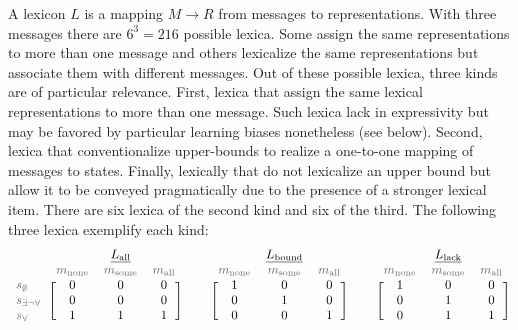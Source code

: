 \documentclass[a4paper, 11pt]{article}
\theoremstyle{Satz}
\newcommand{\state}{\ensuremath{s}\xspace}		%
\newcommand{\mystate}[1]{\ensuremath{\state_{\text{#1}}}\xspace} %
\newcommand{\mylang}[1]{\ensuremath{L_{\text{#1}}}\xspace} %
\newcommand{\Messgs}{\ensuremath{M}\xspace}		%
\newcommand{\messg}{\ensuremath{m}\xspace}		%
\newcommand{\mymessg}[1]{\ensuremath{\messg_{\text{#1}}}\xspace} %
\newcommand{\ssome}{\mystate{\ensuremath{\exists\neg\forall}}}
\newcommand{\sall}{\mystate{\ensuremath{\forall}}}
\newcommand{\snone}{\mystate{\ensuremath{\emptyset}}}
\newcommand{\msome}{\mymessg{some}}
\newcommand{\mall}{\mymessg{all}}
\newcommand{\mnone}{\mymessg{none}}
\newcommand{\Lall}{\mylang{all}}
\newcommand{\Lbound}{\mylang{bound}}
\newcommand{\Llack}{\mylang{lack}}
\newcommand{\mygray}[1]{{\textcolor{mygray}{#1}}}
\begin{document}
A lexicon $L$ is a mapping $\Messgs \rightarrow R$ from messages to representations. With three
messages there are $6^3 = 216$ possible lexica. Some assign the same representations to more than one
message and others lexicalize the same representations but associate them with different messages. Out
of these possible lexica, three kinds are of particular relevance. First, lexica that assign
the same lexical representations to more than one message. Such lexica lack in expressivity but may be favored
by particular learning biases nonetheless (see below). Second, lexica that conventionalize
upper-bounds to realize a one-to-one mapping of messages to states. Finally, lexically that do
not lexicalize an upper bound but allow it to be conveyed pragmatically due to the presence of
a stronger lexical item. There are six lexica of the second kind and six of the third. 
The following three lexica exemplify each kind:
\begin{align*}
  \begin{blockarray}{lccc}
    & & \underline{\Lall} & \\
    & \mygray{\mnone} & \mygray{\msome} & \mygray{\mall} \\
    \begin{block}{l[ccc]}
     \mygray{\snone}  & 0 & 0 & 0\\
     \mygray{\ssome}  & 0 & 0 & 0\\
    \mygray{\sall}   & 1 & 1 & 1\\
    \end{block}
  \end{blockarray} & &
 \begin{blockarray}{lccc}
    & & \underline{\Lbound} & \\
    & \mygray{\mnone} & \mygray{\msome} & \mygray{\mall} \\
    \begin{block}{l[ccc]}
       & 1 & 0 & 0\\
       & 0 & 1 & 0\\
       & 0 & 0 & 1\\
    \end{block}
  \end{blockarray} & &
  \begin{blockarray}{lccc}
    & & \underline{\Llack} & \\
    & \mygray{\mnone} & \mygray{\msome} & \mygray{\mall} \\
    \begin{block}{l[ccc]}
       & 1 & 0 & 0\\
       & 0 & 1 & 0\\
       & 0 & 1 & 1\\
    \end{block}
  \end{blockarray}
\end{align*}
\end{document}
